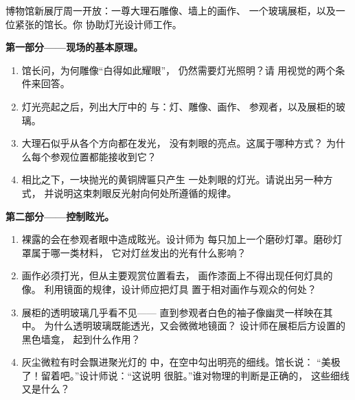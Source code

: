 \begin{problem}\label{pb:g7:light-sources-propagation:1}
博物馆新展厅周一开放：一尊大理石雕像、墙上的画作、
一个玻璃展柜，以及一位紧张的馆长。你
协助灯光设计师工作。

\medskip\noindent\textbf{第一部分——现场的基本原理。}
\begin{enumerate}
  \item 馆长问，为何雕像“白得如此耀眼”，
        仍然需要灯光照明？请
        用视觉的两个条件来回答。
  \item 灯光亮起之后，列出大厅中的
        与：灯、雕像、画作、
        参观者，以及展柜的玻璃。
  \item 大理石似乎从各个方向都在发光，
        没有刺眼的亮点。这属于哪种方式？
        为什么每个参观位置都能接收到它？
  \item 相比之下，一块抛光的黄铜牌匾只产生
        一处刺眼的灯光。请说出另一种方式，
        并说明这束刺眼反光射向何处所遵循的规律。
\end{enumerate}

\medskip\noindent\textbf{第二部分——控制眩光。}
\begin{enumerate}[resume]
  \item 裸露的会在参观者眼中造成眩光。设计师为
        每只加上一个磨砂灯罩。磨砂灯罩属于哪一类材料，
        它对灯丝发出的光有什么影响？
  \item 画作必须打光，但从主要观赏位置看去，
        画作漆面上不得出现任何灯具的\emph{}像。
        利用镜面的规律，设计师应把灯具
        置于相对画作与观众的何处？
  \item 展柜的透明玻璃几乎看不见——
        直到参观者白色的袖子像幽灵一样映在其中。
        为什么透明玻璃既能透光，又会微微地镜面？
        设计师在展柜后方设置的黑色墙龛，
        起到什么作用？
  \item 灰尘微粒有时会飘进聚光灯的
        中，在空中勾出明亮的细线。馆长说：
        “美极了！留着吧。”设计师说：“这说明
        很脏。”谁对物理的判断是正确的，
        这些细线又是什么？
\end{enumerate}


\end{problem}
